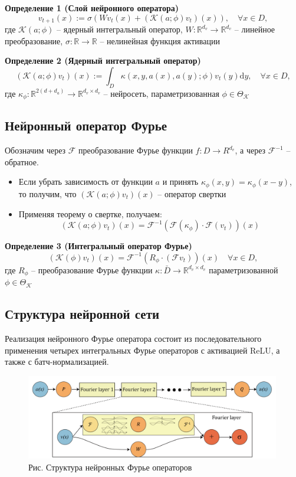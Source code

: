 \textbf{Определение 1 (Слой нейронного оператора)}
	$$v_{t+1}(x):=\sigma\left(W v_{t}(x)+\left(\mathcal{K}(a ; \phi) v_{t}\right)(x)\right), \quad \forall x \in D,$$
	где  $\mathcal{K}(a ; \phi)$ -- ядерный интегральный оператор, $W: \mathbb{R}^{d_{v}} \rightarrow \mathbb{R}^{d_{v}}$ -- линейное преобразование, $\sigma: \mathbb{R} \rightarrow \mathbb{R}$ -- нелинейная функция активации


\textbf{Определение 2 (Ядерный интегральный оператор)}
	$$
	\left(\mathcal{K}(a ; \phi) v_{t}\right)(x):=\int_{D} \kappa(x, y, a(x), a(y) ; \phi) v_{t}(y) \mathrm{d} y, \quad \forall x \in D,$$
	где  $\kappa_{\phi}: \mathbb{R}^{2\left(d+d_{a}\right)} \rightarrow \mathbb{R}^{d_{v} \times d_{v}}$ --  нейросеть, параметризованная $\phi \in \Theta_{\mathcal{K}}$

\subsection{Нейронный оператор Фурье}
Обозначим через $\mathcal{F}$ преобразование Фурье функции $f: D \to R^{d_v}$, а через $\mathcal{F}^{-1}$ -- обратное.
\begin{itemize}
	\item Если убрать зависимость от функции $a$ и принять $\kappa_{\phi}(x, y)=\kappa_{\phi}(x-y)$, то получим, что $\left(\mathcal{K}(a ; \phi) v_{t}\right)(x)$ -- оператор свертки
	\item Применяя теорему о свертке, получаем:
	$$
	\left(\mathcal{K}(a ; \phi) v_{t}\right)(x)=\mathcal{F}^{-1}\left(\mathcal{F}\left(\kappa_{\phi}\right) \cdot \mathcal{F}\left(v_{t}\right)\right)(x) $$
	
\end{itemize}

\textbf{Определение 3 (Интегральный оператор Фурье)}
	$$
	\left(\mathcal{K}(\phi) v_{t}\right)(x)=\mathcal{F}^{-1}\left(R_{\phi} \cdot\left(\mathcal{F} v_{t}\right)\right)(x) \quad \forall x \in D,
	$$ 
	где $R_{\phi}$ -- преобразование Фурье функции $\kappa: \bar{D} \rightarrow \mathbb{R}^{d_{v} \times d_{v}}$ параметризованной $\phi \in \Theta_{\mathcal{K}}$
	
\subsection{Структура нейронной сети}
	Реализация нейронного Фурье оператора состоит из последовательного применения четырех интегральных Фурье операторов с активацией ReLU, а также с батч-нормализацией. 
	\begin{figure}[h]
		\centering
		\includegraphics[width=0.99\textwidth]{chapters/severilov_s1/pics/architecture}
		\caption{Рис.  Структура нейронных Фурье операторов}
	\end{figure}

